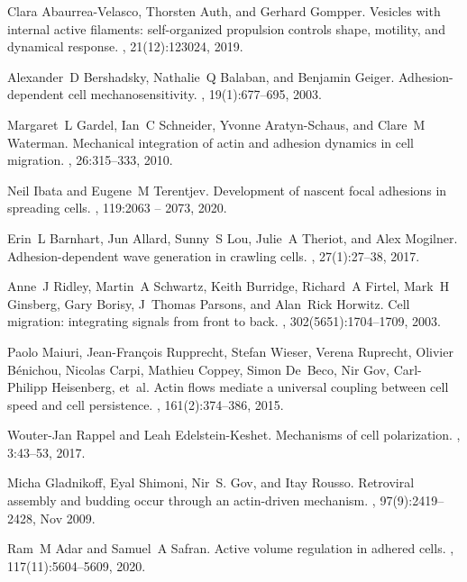 \documentclass[pre,amsmath]{revtex4}
\begin{document}
\begin{thebibliography}{10}
Clara Abaurrea-Velasco, Thorsten Auth, and Gerhard Gompper.
\newblock Vesicles with internal active filaments: self-organized propulsion
  controls shape, motility, and dynamical response.
, 21(12):123024, 2019.

Alexander~D Bershadsky, Nathalie~Q Balaban, and Benjamin Geiger.
\newblock Adhesion-dependent cell mechanosensitivity.
,
  19(1):677--695, 2003.

Margaret~L Gardel, Ian~C Schneider, Yvonne Aratyn-Schaus, and Clare~M Waterman.
\newblock Mechanical integration of actin and adhesion dynamics in cell
  migration.
, 26:315--333,
  2010.

Neil Ibata and Eugene~M Terentjev.
\newblock Development of nascent focal adhesions in spreading cells.
, 119:2063 -- 2073, 2020.

Erin~L Barnhart, Jun Allard, Sunny~S Lou, Julie~A Theriot, and Alex Mogilner.
\newblock Adhesion-dependent wave generation in crawling cells.
, 27(1):27--38, 2017.

Anne~J Ridley, Martin~A Schwartz, Keith Burridge, Richard~A Firtel, Mark~H
  Ginsberg, Gary Borisy, J~Thomas Parsons, and Alan~Rick Horwitz.
\newblock Cell migration: integrating signals from front to back.
, 302(5651):1704--1709, 2003.

Paolo Maiuri, Jean-Fran{\c{c}}ois Rupprecht, Stefan Wieser, Verena Ruprecht,
  Olivier B{\'e}nichou, Nicolas Carpi, Mathieu Coppey, Simon De~Beco, Nir Gov,
  Carl-Philipp Heisenberg, et~al.
\newblock Actin flows mediate a universal coupling between cell speed and cell
  persistence.
, 161(2):374--386, 2015.

Wouter-Jan Rappel and Leah Edelstein-Keshet.
\newblock Mechanisms of cell polarization.
, 3:43--53, 2017.

Micha Gladnikoff, Eyal Shimoni, Nir~S. Gov, and Itay Rousso.
\newblock Retroviral assembly and budding occur through an actin-driven
  mechanism.
, 97(9):2419--2428, Nov 2009.

Ram~M Adar and Samuel~A Safran.
\newblock Active volume regulation in adhered cells.
,
  117(11):5604--5609, 2020.

\end{thebibliography}
\end{document}
